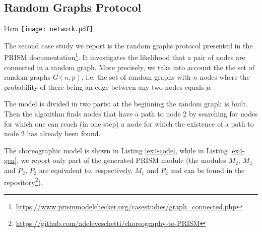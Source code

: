\begin{comment}
module Client1
	Client1 : [0..1] init 0;
	b11 : [0..1]; 
	b12 : [0..1]; 
	b13 : [0..1]; 
	b14 : [0..1]; 
	b15 : [0..1]; 

	[] (Client1=0)  $\rightarrow$ rate1 : (b11'=1)$\&$(Client1'=0); 
	[] (Client1=0)  $\rightarrow$ rate2 : (b12'=1)$\&$(Client1'=0); 
	[] (Client1=0)  $\rightarrow$ rate3 : (b13'=1)$\&$(Client1'=0); 
	[] (Client1=0)  $\rightarrow$ rate4 : (b14'=1)$\&$(Client1'=0); 
	[] (Client1=0)  $\rightarrow$ rate5 : (b15'=1)$\&$(Client1'=0); 
	
endmodule
	
\end{lstlisting}


In Figure \ref{ex2-res}, we compare the values obtained for the probability that all clients have received all blocks by time $0\leq T\leq 1.5$ both for our generated model and the model reported in the documentation.
\begin{figure}[h]
\centering
\texttt{[image: example3-results.jpeg]}	
\caption{Probability that clients received all the block before $T$, with $0\leq T \leq 1.5$.}
\label{ex2-res}
\end{figure}
\end{comment}
\newpage
\subsection{Random Graphs Protocol}
\begin{wrapfigure}[8]{l}{4cm}
	\texttt{[image: network.pdf]}	
\end{wrapfigure} 
The second case study we report is the random graphs protocol presented in the PRISM documentation\footnote{\url{https://www.prismmodelchecker.org/casestudies/graph_connected.php}}.
It investigates the likelihood that a pair of nodes are connected in a
 random graph. More precisely, we take into account the the set of random graphs $G(n,p)$,
  i.e. the set of random graphs with $n$ nodes where the probability of there being an edge 
  between any two nodes equals $p$. 

  The model is divided in two parts: at the beginning the random graph is built.
Then the algorithm finds nodes that have a path to node 2 by searching for nodes for which one can reach (in one step) a node for which the existence of a path to node 2 has already been found.

The choreographic model is shown in Listing \ref{ex4-code}, while
in Listing \ref{ex4-gen}, we report only part of the generated PRISM module (the modules $M_2$, $M_3$ and $P_2$, $P_3$ are equivalent to, respectively, $M_1$ and $P_2$ and can be found in the repository\footnote{\url{https://github.com/adeleveschetti/choreography-to-PRISM}}).


